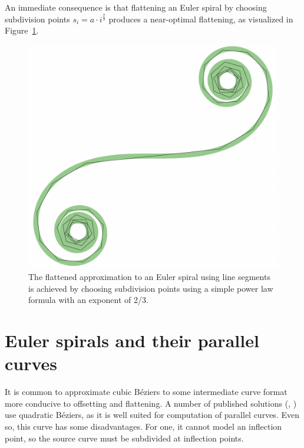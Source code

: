 \documentclass[sigconf, nonacm]{acmart}
\begin{document}
An immediate consequence is that flattening an Euler spiral by choosing subdivision points $s_i = a\cdot i^\frac{2}{3}$ produces a near-optimal flattening, as visualized in Figure~\ref{fig:es_flatten}.

\begin{figure}
    \includegraphics[scale=0.3]{es_flatten}
    \caption{The flattened approximation to an Euler spiral using line segments is achieved by choosing subdivision points using a simple power law formula with an exponent of 2/3.}
    \label{fig:es_flatten}
\end{figure}


\section{Euler spirals and their parallel curves}

It is common to approximate cubic Béziers to some intermediate curve format more conducive to offsetting and flattening. A number of published solutions (\citet{Yzerman2020}, \citet{Nehab2020}) use quadratic Béziers, as it is well suited for computation of parallel curves. Even so, this curve has some disadvantages. For one, it cannot model an inflection point, so the source curve must be subdivided at inflection points.
\end{document}
